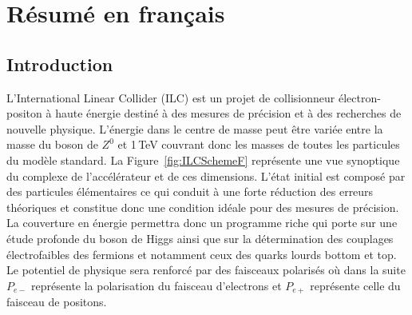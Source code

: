 \section{R\'esum\'e en fran\c cais}

\renewcommand{\sm}{modèle standard}
\renewcommand{\bsm}{au delà du modèle standard}
\subsection*{Introduction}


L'International Linear Collider \cite{bib:ILC} (ILC) est un projet de collisionneur électron-positon à haute énergie destiné à des mesures de précision et à des recherches de nouvelle physique.
L’énergie dans le centre de masse peut être variée entre la masse du boson de $Z^0$ et 1\,TeV couvrant donc les masses de toutes les particules du modèle standard. 
La Figure~\ref{fig:ILCSchemeF} représente une vue synoptique du complexe de l’accélérateur et de ces dimensions. 
L’état initial est composé par des particules élémentaires ce qui conduit à une forte réduction des erreurs théoriques et constitue donc une condition idéale pour des mesures de précision. La couverture en énergie permettra donc un programme riche qui porte sur une étude profonde du boson de Higgs ainsi que sur la détermination des couplages électrofaibles des fermions et notamment ceux des quarks lourds bottom et top. Le potentiel de physique sera renforcé par des faisceaux polarisés où dans la suite $P_{e-}$ représente la polarisation du faisceau d’electrons et $P_{e+}$ représente celle du faisceau de positons.




